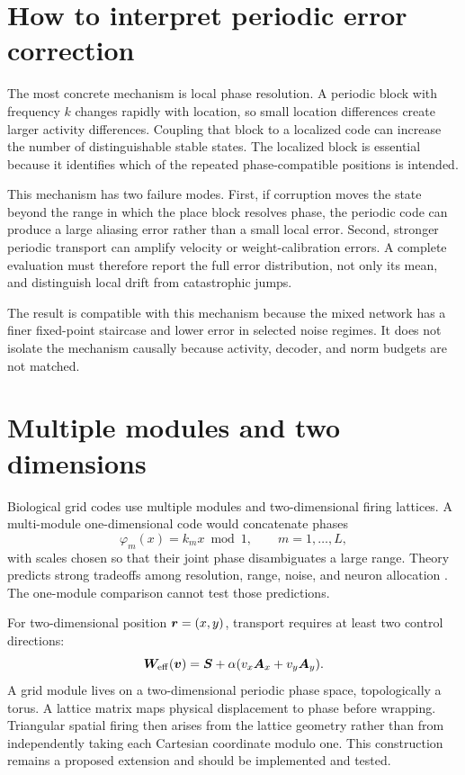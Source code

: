 \section{How to interpret periodic error correction}
\label{sec:attractor-interpretation}

The most concrete mechanism is local phase resolution. A periodic block with frequency $k$ changes rapidly with location, so small location differences create larger activity differences. Coupling that block to a localized code can increase the number of distinguishable stable states. The localized block is essential because it identifies which of the repeated phase-compatible positions is intended.

This mechanism has two failure modes. First, if corruption moves the state beyond the range in which the place block resolves phase, the periodic code can produce a large aliasing error rather than a small local error. Second, stronger periodic transport can amplify velocity or weight-calibration errors. A complete evaluation must therefore report the full error distribution, not only its mean, and distinguish local drift from catastrophic jumps.

The result is compatible with this mechanism because the mixed network has a finer fixed-point staircase and lower error in selected noise regimes. It does not isolate the mechanism causally because activity, decoder, and norm budgets are not matched.

\section{Multiple modules and two dimensions}
\label{sec:attractor-extensions}

Biological grid codes use multiple modules and two-dimensional firing lattices. A multi-module one-dimensional code would concatenate phases
\begin{equation}
\varphi_m(x)=k_mx\bmod 1,
\qquad m=1,\ldots,L,
\end{equation}
with scales chosen so that their joint phase disambiguates a large range. Theory predicts strong tradeoffs among resolution, range, noise, and neuron allocation \citep{ss11,wei15,stemmler15}. The one-module comparison cannot test those predictions.

For two-dimensional position $\bm{r}=(x,y)$, transport requires at least two control directions:
\begin{equation}
\label{eq:attractor-2d-transport}
\bm{W}_{\mathrm{eff}}(\bm{v})
=\bm{S}+\alpha(v_x\bm{A}_x+v_y\bm{A}_y).
\end{equation}
A grid module lives on a two-dimensional periodic phase space, topologically a torus. A lattice matrix maps physical displacement to phase before wrapping. Triangular spatial firing then arises from the lattice geometry rather than from independently taking each Cartesian coordinate modulo one. This construction remains a proposed extension and should be implemented and tested.

